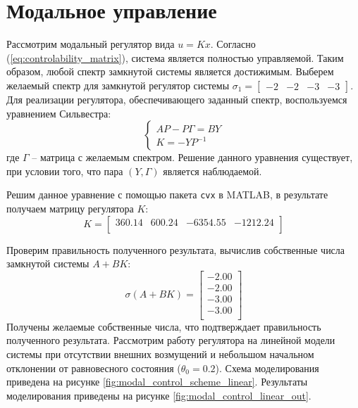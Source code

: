 \section{Модальное управление}
Рассмотрим модальный регулятор вида $u = Kx$. Согласно (\ref{eq:controlability_matrix}), система является 
полностью управляемой. Таким образом, любой спектр замкнутой системы является достижимым. 
Выберем желаемый спектр для замкнутой регулятор системы $\sigma_1 = \begin{bmatrix}-2 & -2 & -3 & -3\end{bmatrix}$. 
Для реализации регулятора, обеспечивающего заданный спектр, воспользуемся уравнением Сильвестра: 
\begin{equation}
    \begin{cases}
        AP - P\Gamma = BY \\
        K = -YP^{-1} 
    \end{cases}
\end{equation}
где $\Gamma$ -- матрица с желаемым спектром. 
Решение данного уравнения существует, при условии того, что пара $(Y, \Gamma)$ является наблюдаемой.

Решим данное уравнение с помощью пакета \texttt{cvx} в MATLAB, в результате получаем матрицу регулятора $K$:
\begin{equation}
    K = \begin{bmatrix}
    360.14  & 600.24  & -6354.55  & -1212.24 \\ 
    \end{bmatrix}
\end{equation} 

Проверим правильность полученного результата, вычислив собственные числа замкнутой системы $A + BK$: 
\begin{equation}
    \sigma(A + BK) = \begin{bmatrix}
    -2.00 \\ 
    -2.00 \\ 
    -3.00 \\ 
    -3.00 \\ 
    \end{bmatrix}
\end{equation}
Получены желаемые собственные числа, что подтверждает правильность полученного результата. 
Рассмотрим работу регулятора на линейной модели системы при отсутствии внешних возмущений и 
небольшом начальном отклонении от равновесного состояния ($\theta_0 = 0.2$). Схема моделирования приведена на 
рисунке \ref{fig:modal_control_scheme_linear}. Результаты моделирования приведены на 
рисунке \ref{fig:modal_control_linear_out}.


